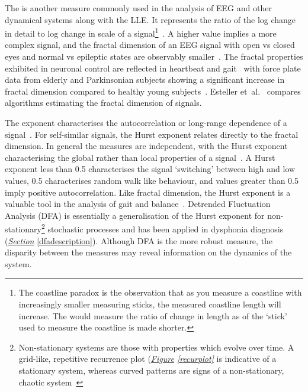 \documentclass[12pt, twoside]{book}
\renewcommand\emph[1]{\textit{\color{USred}{#1}}}
\begin{document}

The \emph{fractal dimension} is another measure commonly used in the analysis of EEG and other dynamical systems along with the LLE. It represents the ratio of the log change in detail to log change in scale of a signal\footnote{The coastline paradox is the observation that as you measure a coastline with increasingly smaller measuring sticks, the measured coastline length will increase. The \emph{fractal dimension} would measure the ratio of change in length as of the `stick' used to measure the coastline is made shorter.}~\cite{mandelbrot1967long}. A higher value implies a more complex signal, and the fractal dimension of an EEG signal with open vs closed eyes and normal vs epileptic states are observably smaller~\cite{eegfractal, seizuredimensions}. The fractal properties exhibited in neuronal control are reflected in heartbeat and gait~\cite{fractalgait} with force plate data from elderly and Parkinsonian subjects showing a significant increase in fractal dimension compared to healthy young subjects~\cite{hfdcop, fractalpd, fractalbalance}. Esteller et~al.~\cite{fractaldimensions} compares algorithms estimating the fractal dimension of signals.

The \emph{Hurst} exponent characterises the autocorrelation or long-range dependence of a signal~\cite{hurst1965long}. For self-similar signals, the Hurst exponent relates directly to the fractal dimension. In general the measures are independent, with the Hurst exponent characterising the global rather than local properties of a signal~\cite{hurstfractal}. A Hurst exponent less than 0.5 characterises the signal `switching' between high and low values, 0.5 characterises random walk like behaviour, and values greater than 0.5 imply positive autocorrelation. Like fractal dimension, the Hurst exponent is a valuable tool in the analysis of gait and balance~\cite{duarte2000fractal}. Detrended Fluctuation Analysis (DFA) is essentially a generalisation of the Hurst exponent for non-stationary\footnote{Non-stationary systems are those with properties which evolve over time. A grid-like, repetitive recurrence plot (\textit{\hyperref[recurplot]{Figure} \ref{recurplot}} is indicative of a stationary system, whereas curved patterns are signs of a non-stationary, chaotic system~\cite{facchini2005recurrence}} stochastic processes and has been applied in dysphonia diagnosis (\textit{\hyperref[dfadescription]{Section}} \ref{dfadescription}). Although DFA is the more robust measure, the disparity between the measures may reveal information on the dynamics of the system.
\end{document}
